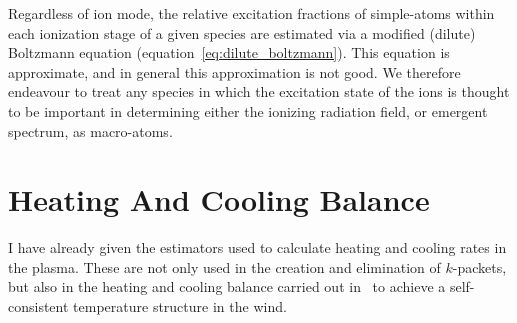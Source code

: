 
Regardless of ion mode, the relative excitation fractions of simple-atoms
within each ionization stage of a given species are estimated via a modified (dilute) Boltzmann
equation (equation~\ref{eq:dilute_boltzmann}). This equation is approximate, and in 
general this approximation is not good. We therefore endeavour to treat any species in
which the excitation state of the ions is thought to be important
in determining either the ionizing radiation field, or emergent spectrum,
as macro-atoms.


\section{Heating And Cooling Balance}
\label{sec:heating_cooling}
I have already given the estimators used to calculate
heating and cooling rates in the plasma. These are not only used
in the creation and elimination of $k$-packets, but also in the heating
and cooling balance carried out in \py\ to achieve a self-consistent
temperature structure in the wind. 

